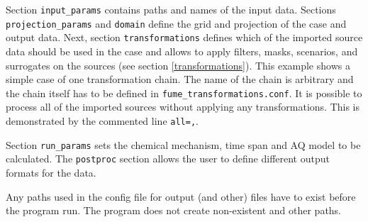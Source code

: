 \documentclass[a4paper,11pt]{article}
\begin{document}
Section \verb|input_params| contains paths and names of the input data. Sections \verb|projection_params| and \verb|domain| define the grid and projection of the case and output data. Next, section \verb|transformations| defines which of the imported source data should be used in the case and allows to apply filters, masks, scenarios, and surrogates on the sources (see section \ref{transformations}). This example shows a simple case of one transformation chain. The name of the chain is arbitrary and the chain itself has to be defined in \verb|fume_transformations.conf|. It is possible to process all of the imported sources without applying any transformations. This is demonstrated by the commented line \texttt{all=,}.

Section \verb|run_params| sets the chemical mechanism, time span and AQ model to be calculated. The \verb|postproc| section allows the user to define different output formats for the data.

Any paths used in the config file for output (and other) files have to exist before the program run. The program does not create non-existent and other paths.
\end{document}
